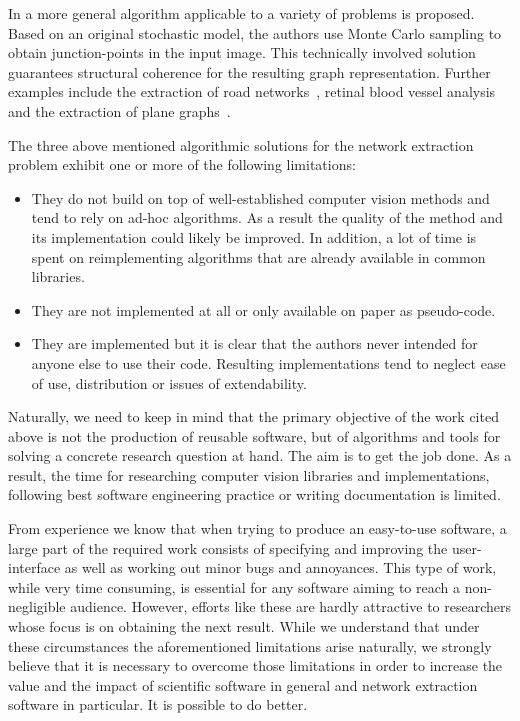 	In \cite{chai2013recovering} a more general algorithm applicable to a variety of problems is proposed. Based on an original stochastic model, the authors use Monte Carlo sampling to obtain junction-points in the input image. This technically involved solution guarantees structural coherence for the resulting graph representation. Further examples include the extraction of road networks~\cite{nglt2006}, retinal blood vessel analysis~\cite{krause2013fast} and the extraction of plane graphs~\cite{hewrw2010}.

	The three above mentioned algorithmic solutions for the network extraction problem exhibit one or more of the following	limitations: 

	\begin{itemize}
		\item They do not build on top of well-established computer vision methods and tend to rely on ad-hoc algorithms. As a result the quality of the method and its implementation could likely be improved. In addition, a lot of time is spent on reimplementing algorithms that are already available in common libraries. 

		\item They are not implemented at all or only available on paper as pseudo-code.

		\item They are implemented but it is clear that the authors never intended for anyone else to use their code. Resulting implementations tend to neglect ease of use, distribution or issues of extendability.
	\end{itemize}

	Naturally, we need to keep in mind that the primary objective of the work cited above is not the production of reusable software, but of algorithms and tools for solving a concrete research question at hand. The aim is to get the job done. As a result, the time for researching computer vision libraries and implementations, following best software engineering practice or writing documentation is limited. 

	From experience we know that when trying to produce an easy-to-use software, a large part of the required work consists of specifying and improving the user-interface as well as working out minor bugs and annoyances. This type of work, while very time consuming, is essential for any software aiming to reach a non-negligible audience. However, efforts like these are hardly attractive to researchers whose focus is on obtaining the next result. While we understand that under these circumstances the aforementioned limitations arise naturally, we strongly believe that it is necessary to overcome those limitations in order to increase the value and the impact of scientific software in general and network extraction software in particular. It is possible to do better.

